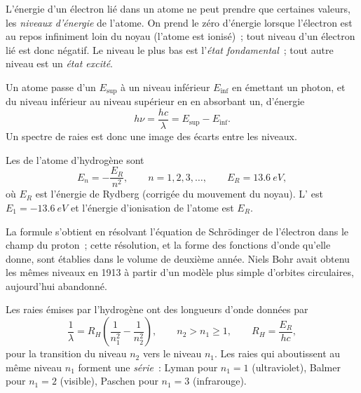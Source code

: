 \begin{definition}\label{def:b1:quantum-numbers:energy-level}
L'énergie d'un électron lié dans un atome ne peut prendre que certaines
valeurs, les \emph{niveaux d'énergie} de l'atome. On prend
le zéro d'énergie lorsque l'électron est au repos infiniment loin du
noyau (l'atome est ionisé)~; tout niveau d'un électron lié est donc
négatif. Le niveau le plus bas est l'\emph{état fondamental}~;
tout autre niveau est un \emph{état excité}.
\end{definition}

Un atome passe d'un  $E_{\text{sup}}$ à un niveau
inférieur $E_{\text{inf}}$ en émettant un photon, et du niveau inférieur
au niveau supérieur en en absorbant un, d'énergie
\[
  h\nu = \frac{hc}{\lambda} = E_{\text{sup}} - E_{\text{inf}} .
\]
Un spectre de raies est donc une image des écarts entre les niveaux.

\begin{theorem}\label{thm:b1:quantum-numbers:levels}
Les  de l'atome d'hydrogène sont
\[
  E_n = -\frac{E_R}{n^2}, \qquad n = 1, 2, 3, \dots,
  \qquad E_R = \qty{13.6}{eV},
\]
où $E_R$ est l'énergie de Rydberg (corrigée du mouvement du noyau).
L' est $E_1 = \qty{-13.6}{eV}$ et l'énergie
d'ionisation de l'atome est $E_R$.
\end{theorem}
\admitted

\begin{remark}\label{rem:b1:quantum-numbers:schrodinger}
La formule s'obtient en résolvant l'équation de Schrödinger de
l'électron dans le champ du proton~; cette résolution, et la forme des
fonctions d'onde qu'elle donne, sont établies dans le volume de
deuxième année. Niels Bohr avait obtenu les mêmes niveaux en 1913 à
partir d'un modèle plus simple d'orbites circulaires, aujourd'hui abandonné.
\end{remark}

\begin{proposition}\label{prop:b1:quantum-numbers:rydberg}
Les raies émises par l'hydrogène ont des longueurs d'onde données par
\[
  \frac{1}{\lambda} = R_H\left(\frac{1}{n_1^2} - \frac{1}{n_2^2}\right),
  \qquad n_2 > n_1 \ge 1, \qquad R_H = \frac{E_R}{hc},
\]
pour la transition du niveau $n_2$ vers le niveau $n_1$. Les raies qui
aboutissent au même niveau $n_1$ forment une \emph{série}~: Lyman pour
$n_1 = 1$ (ultraviolet), Balmer pour $n_1 = 2$ (visible), Paschen pour
$n_1 = 3$ (infrarouge).
\end{proposition}

